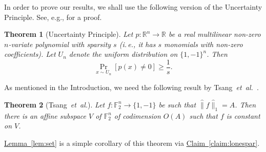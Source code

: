 \documentclass[11pt]{article}
\numberwithin{equation}{section}
\newtheorem{theorem}{Theorem}[section]
\theoremstyle{definition}
\theoremstyle{plain}
\newcommand{\ie}{i.\,e.}
\newcommand{\etal}{{\it et~al.}}
\newcommand{\lref}[2][]{\hyperref[#2]{#1~\ref*{#2}}}
\begin{document}
In order to prove our results, we shall use the following version of the Uncertainty Principle. See, e.g., \cite{DBLP:journals/cjtcs/GurT13} for a proof.
\begin{theorem}[Uncertainty Principle]
\label{thm:up}
Let $p: \mathbb{R}^n \rightarrow \mathbb{R}$ be a real
%
multilinear   %
non-zero
 $n$-variate polynomial with sparsity $s$ (\ie, it has $s$ monomials with non-zero coefficients). Let $U_n$ denote the 
uniform distribution on $\{1,-1\}^n$. Then
\[\Pr_{x \sim U_n}[p(x) \neq 0] \geq \frac{1}{s}.\]
\end{theorem}
As
%
mentioned  %
in the
%
Introduction,    %
we need the following
%
%
%
%
result by Tsang~\etal~\cite[Lemma 28]{tsang}.
\begin{theorem}[Tsang~\etal]
\label{sphilka}
Let $f:\mathbb{F}_2^n \rightarrow \{1,-1\}$ be such that
$\widehat{\|}f\widehat{\|}_1=A$. Then there is an affine subspace
$V$ of $\mathbb{F}_2^n$ of codimension $O(A)$ such
that $f$ is constant on $V$.
\end{theorem}

\lref[Lemma]{lem:set} is a simple corollary of this theorem via \lref[Claim]{claim:lonespar}.
\end{document}
